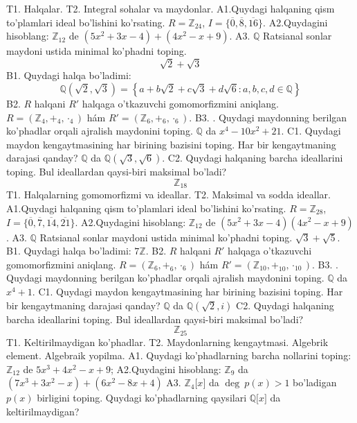 T1. Halqalar.
T2. Integral sohalar va maydonlar.
A1.Quydagi halqaning qism to'plamlari ideal bo'lishini ko'rsating.
\(R = \mathbb{Z}_{24}\), \(I = \{\overline{0},\overline{8},\overline{16}\}\).
A2.Quydagini hisoblang:
\(\mathbb{Z}_{12}\) de \(\left( 5x^{2} + 3x - 4 \right) + \left( 4x^{2} - x + 9 \right)\).
A3. \(\mathbb{Q}\) Ratsianal sonlar maydoni ustida minimal ko'phadni toping.
\[\sqrt{2} + \sqrt{3}\]
B1. Quydagi halqa bo'ladimi:
\[\mathbb{Q}\left( \sqrt{2},\sqrt{3} \right) = \left\{ a + b\sqrt{2} + c\sqrt{3} + d\sqrt{6}:a,b,c,d \in \mathbb{Q} \right\}\]
B2. \(R\) halqani \(R'\) halqaga o'tkazuvchi gomomorfizmini aniqlang.
\(R = (\mathbb{Z}_{4}, +_{4}, \cdot_{4})\) hám \(R' = (\mathbb{Z}_{6}, +_{6}, \cdot_{6})\).
B3. . Quydagi maydonning berilgan ko'phadlar orqali ajralish maydonini toping.
\(\mathbb{Q}\) da \(x^{4} - 10x^{2} + 21\).
C1. Quydagi maydon kengaytmasining har birining bazisini toping. Har bir kengaytmaning darajasi qanday?
\(\mathbb{Q}\) da \(\mathbb{Q}\left( \sqrt{3},\sqrt{6} \right)\).
C2. Quydagi halqaning barcha ideallarini toping. Bul ideallardan qaysi-biri maksimal bo'ladi?
\[\mathbb{Z}_{18}\]
T1. Halqalarning gomomorfizmi va ideallar.
T2. Maksimal va sodda ideallar.
A1.Quydagi halqaning qism to'plamlari ideal bo'lishini ko'rsating.
\(R = \mathbb{Z}_{28}\), \(I = \{\overline{0},\overline{7},\overline{14},\overline{21}\}\).
A2.Quydagini hisoblang:
\(\mathbb{Z}_{12}\) de \(\left( 5x^{2} + 3x - 4 \right)\left( 4x^{2} - x + 9 \right)\).
A3. \(\mathbb{Q}\) Ratsianal sonlar maydoni ustida minimal ko'phadni toping.
\(\sqrt{3} + \sqrt{5}\).
B1. Quydagi halqa bo'ladimi:
\(7\mathbb{Z}\).
B2. \(R\) halqani \(R'\) halqaga o'tkazuvchi gomomorfizmini aniqlang.
\(R = (\mathbb{Z}_{6}, +_{6}, \cdot_{6})\) hám \(R' = (\mathbb{Z}_{10}, +_{10}, \cdot_{10})\).
B3. . Quydagi maydonning berilgan ko'phadlar orqali ajralish maydonini toping.
\(\mathbb{Q}\) da \(x^{4} + 1\).
C1. Quydagi maydon kengaytmasining har birining bazisini toping. Har bir kengaytmaning darajasi qanday?
\(\mathbb{Q}\) da \(\mathbb{Q}\left( \sqrt{2},i \right)\)
C2. Quydagi halqaning barcha ideallarini toping. Bul ideallardan qaysi-biri maksimal bo'ladi?
\[\mathbb{Z}_{25}\]
T1. Keltirilmaydigan ko'phadlar.
T2. Maydonlarning kengaytmasi. Algebrik element. Algebraik yopilma.
A1. Quydagi ko'phadlarning barcha nollarini toping:
\(\mathbb{Z}_{12}\) de \(5x^{3} + 4x^{2} - x + 9\);
A2.Quydagini hisoblang:
\(\mathbb{Z}_{9}\) da \(\left( 7x^{3} + 3x^{2} - x \right) + \left( 6x^{2} - 8x + 4 \right)\)
A3. \(\mathbb{Z}_{4}\lbrack x\rbrack\) da \(\deg\ p(x) > 1\) bo'ladigan \(p(x)\) birligini toping. Quydagi ko'phadlarning qaysilari \(\mathbb{Q\lbrack}x\rbrack\) da keltirilmaydigan?
